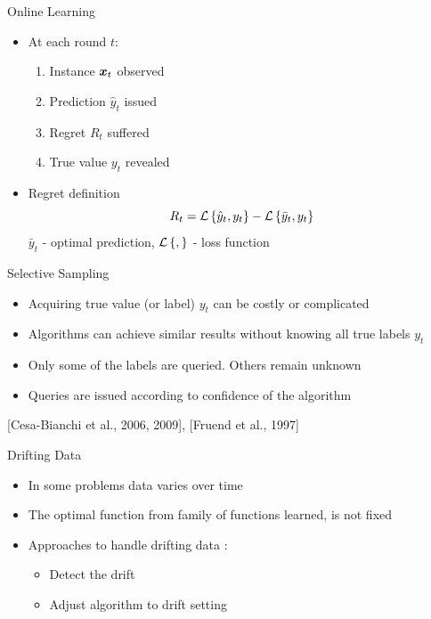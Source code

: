 \documentclass{beamer}
\begin{document}
\begin{frame}{Online Learning}
\begin{itemize}
\item At each round $t$:\newline
\begin{enumerate}
\item Instance ${\boldsymbol{x}}_{t}$ observed\newline
\item Prediction $\hat{y}_t$ issued\newline
\item Regret $R_t$ suffered\newline
\item True value $y_t$ revealed\newline
\end{enumerate}
\item Regret definition
\begin{equation*}
R_t={\mathcal{L}}\left\{\hat{y}_t,y_t\right\}-{\mathcal{L}}\left\{\bar{y}_t,y_t\right\}
\end{equation*}
$\bar{y}_t$ - optimal prediction, ${\mathcal{L}}\left\{,\right\}$ - loss function
\end{itemize}
\end{frame}


\begin{frame}{Selective Sampling}
\begin{itemize}
\item Acquiring true value (or label) $y_t$ can be costly or complicated\newline
\item Algorithms can achieve similar results without knowing all true labels $y_t$\newline
\item Only some of the labels are queried. Others remain unknown\newline
\item Queries are issued according to confidence of the algorithm\newline
\end{itemize}
[Cesa-Bianchi et al., 2006, 2009], [Fruend et al., 1997]
\end{frame}

\begin{frame}{Drifting Data}
\begin{itemize}
\item In some problems data varies over time\newline
\item The optimal function from family of functions learned, is not fixed\newline
\item Approaches to handle drifting data :\newline
\begin{itemize}
\item Detect the drift\newline
\item Adjust algorithm to drift setting
\end{itemize}
\end{itemize}
\end{frame}
\end{document}
